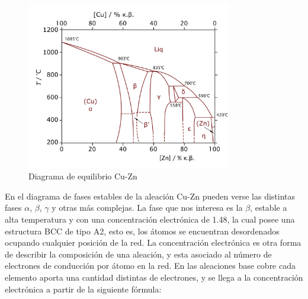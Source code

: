 \documentclass[a4paper,12pt,fleqn,twoside,openany]{book}
\begin{document}
\begin{figure}[h]
 \centering
 \includegraphics[width=0.8\textwidth]{CuZn.png}
 \caption{Diagrama de equilibrio Cu-Zn \cite{CuZn}} 
 \label{fig:CuZnfig}
 \end{figure}

En el diagrama de fases estables de la aleación Cu-Zn pueden verse las distintas fases $\alpha$, $\beta$, $\gamma$ y otras más complejas. La fase que nos interesa es la $\beta$, estable a alta temperatura y con una concentración electrónica de 1.48, la cual posee una estructura BCC de tipo A2, esto es, 
los átomos se encuentran desordenados ocupando cualquier posición de la red. La concentración electrónica es otra forma de describir la composición de una aleación, y esta asociado al número de electrones de conducción por átomo en la red. En las aleaciones base cobre cada elemento aporta una cantidad distintas de electrones, y se llega a la concentración electrónica a partir de la siguiente fórmula:
\end{document}
